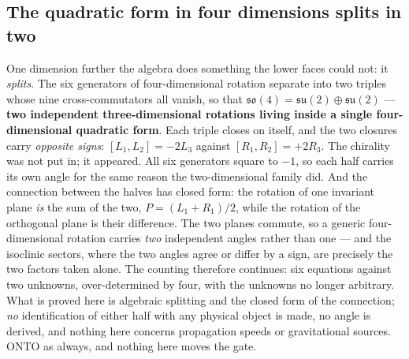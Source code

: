 \documentclass[11pt]{article}
\theoremstyle{definition}\newtheorem{deriv}{Derivation}
\begin{document}
\subsection*{The quadratic form in four dimensions splits in two}One dimension further the algebra does something the lower faces could not: it \emph{splits}. The six generators of four-dimensional rotation separate into two triples whose nine cross-commutators all vanish, so that $\mathfrak{so}(4) = \mathfrak{su}(2)\oplus\mathfrak{su}(2)$ --- \textbf{two independent three-dimensional rotations living inside a single four-dimensional quadratic form}. Each triple closes on itself, and the two closures carry \emph{opposite signs}: $[L_1,L_2] = -2L_3$ against $[R_1,R_2] = +2R_3$. The chirality was not put in; it appeared. All six generators square to $-1$, so each half carries its own angle for the same reason the two-dimensional family did. And the connection between the halves has closed form: the rotation of one invariant plane \emph{is} the sum of the two, $P = (L_1+R_1)/2$, while the rotation of the orthogonal plane is their difference. The two planes commute, so a generic four-dimensional rotation carries \emph{two} independent angles rather than one --- and the isoclinic sectors, where the two angles agree or differ by a sign, are precisely the two factors taken alone. The counting therefore continues: six equations against two unknowns, over-determined by four, with the unknowns no longer arbitrary. What is proved here is algebraic splitting and the closed form of the connection; \emph{no} identification of either half with any physical object is made, no angle is derived, and nothing here concerns propagation speeds or gravitational sources. \textsf{ONTO} as always, and nothing here moves the gate.
\end{document}

